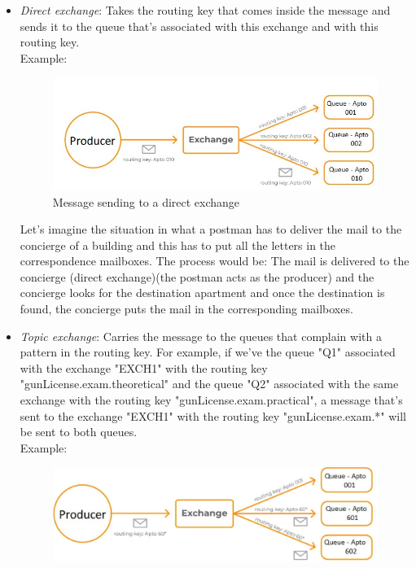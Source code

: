 \documentclass[12pt]{article}
\begin{document}
\begin{itemize}
    \item \textit{Direct exchange}: Takes the routing key that comes inside the message and sends it to the queue that's associated with this exchange and with this routing key.\\
    Example:\\
    \begin{figure}[H]
        \centering
        \includegraphics[scale = 0.7]{Images/direct_exchange.jpg}
        \caption{Message sending to a direct exchange}
        \label{fig:direct_exchange}
    \end{figure}
    Let's imagine the situation in what a postman has to deliver the mail to the concierge of a building and this has to put all the letters in the correspondence mailboxes. The process would be: The mail is delivered to the concierge (direct exchange)(the postman acts as the producer) and the concierge looks for the destination apartment and once the destination is found, the concierge puts the mail in the corresponding mailboxes.
    \item \textit{Topic exchange}: Carries the message to the queues that complain with a pattern in the routing key. For example, if we've the queue "Q1" associated with the exchange "EXCH1" with the routing key "gunLicense.exam.theoretical" and the queue "Q2" associated with the same exchange with the routing key "gunLicense.exam.practical", a message that's sent to the exchange "EXCH1" with the routing key "gunLicense.exam.*" will be sent to both queues.\\
    Example:\\
    \begin{figure}[H]
        \centering
        \includegraphics[scale = 0.4]{Images/topic_exchange.jpg}

\end{figure}
\end{itemize}
\end{document}
